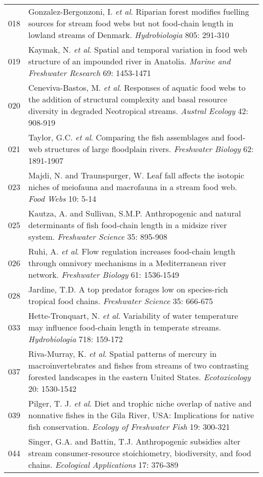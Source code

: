 \begin{longtable}{p{}p{}}
  018 & Gonzalez-Bergonzoni, I. \textit{et al}. Riparian forest modifies fuelling sources for stream food webs but not food-chain length in lowland streams of Denmark. \textit{Hydrobiologia} 805: 291-310 \\ 
  019 & Kaymak, N. \textit{et al}. Spatial and temporal variation in food web structure of an impounded river in Anatolia. \textit{Marine and Freshwater Research} 69: 1453-1471 \\ 
  020 & Ceneviva-Bastos, M. \textit{et al}. Responses of aquatic food webs to the addition of structural complexity and basal resource diversity in degraded Neotropical streams. \textit{Austral Ecology} 42: 908-919 \\ 
  021 & Taylor, G.C. \textit{et al}. Comparing the fish assemblages and food-web structures of large floodplain rivers. \textit{Freshwater Biology} 62: 1891-1907 \\ 
  023 & Majdi, N. and Traunspurger, W. Leaf fall affects the isotopic niches of meiofauna and macrofauna in a stream food web. \textit{Food Webs} 10: 5-14 \\ 
  025 & Kautza, A. and Sullivan, S.M.P. Anthropogenic and natural determinants of fish food-chain length in a midsize river system. \textit{Freshwater Science} 35: 895-908 \\ 
  026 & Ruhi, A. \textit{et al}. Flow regulation increases food-chain length through omnivory mechanisms in a Mediterranean river network. \textit{Freshwater Biology} 61: 1536-1549 \\ 
  028 & Jardine, T.D. A top predator forages low on species-rich tropical food chains. \textit{Freshwater Science} 35: 666-675 \\ 
  033 & Hette-Tronquart, N. \textit{et al}. Variability of water temperature may influence food-chain length in temperate streams. \textit{Hydrobiologia} 718: 159-172 \\ 
  037 & Riva-Murray, K. \textit{et al}. Spatial patterns of mercury in macroinvertebrates and fishes from streams of two contrasting forested landscapes in the eastern United States. \textit{Ecotoxicology} 20: 1530-1542 \\ 
  039 & Pilger, T. J. \textit{et al}. Diet and trophic niche overlap of native and nonnative fishes in the Gila River, USA: Implications for native fish conservation. \textit{Ecology of Freshwater Fish} 19: 300-321 \\ 
  044 & Singer, G.A. and Battin, T.J. Anthropogenic subsidies alter stream consumer-resource stoichiometry, biodiversity, and food chains. \textit{Ecological Applications} 17: 376-389 \\ 

\end{longtable}
